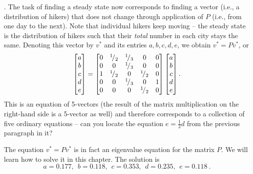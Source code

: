 \begin{application}
{}. The task of finding a steady state now corresponds to finding a vector (i.e., a distribution of hikers) that does not change through application of $P$ (i.e., from one day to the next). Note that individual hikers keep moving -- the steady state is the distribution of hikers such that their \emph{total} number in each city stays the same. Denoting this vector by $v^*$ and its entries $a,b,c,d,e$, we obtain $v^*=Pv^*$, or
\[ \begin{bmatrix} a\\b\\c\\d\\e \end{bmatrix} =
\begin{bmatrix} 0 & {}^{1}\!/_{2} & {}^{1}\!/_{3} & 0 & 0 \\
0 & 0 & {}^{1}\!/_{3} & 0 & 0 \\
1 & {}^{1}\!/_{2} & 0 & {}^{1}\!/_{2} & 0 \\
0 & 0 & {}^{1}\!/_{3} & 0 & 1 \\
0 & 0 & 0 & {}^{1}\!/_{2} & 0 \end{bmatrix} \begin{bmatrix} a\\b\\c\\d\\e \end{bmatrix}. \]
This is an equation of 5-vectors (the result of the matrix multiplication on the right-hand side is a 5-vector as well) and therefore corresponds to a collection of five ordinary equations -- can you locate the equation $e = \tfrac12d$ from the previous paragraph in it?

The equation $v^*=Pv^*$ is in fact an eigenvalue equation for the matrix $P$. We will learn how to solve it in this chapter. The solution is
\[a=0.177,\:\:b=0.118,\:\:c=0.353,\:\:d=0.235,\:\:e=0.118\:.\]
\end{application}



